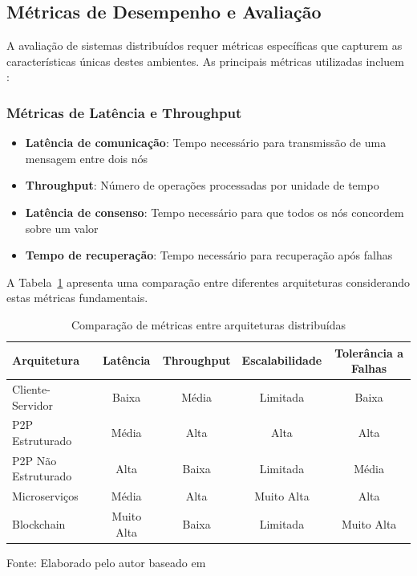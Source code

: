 \subsection{Métricas de Desempenho e Avaliação}

A avaliação de sistemas distribuídos requer métricas específicas que capturem as características únicas destes ambientes. As principais métricas utilizadas incluem \cite{tanenbaum2016sistemas}:

\subsubsection{Métricas de Latência e Throughput}

\begin{itemize}
    \item \textbf{Latência de comunicação}: Tempo necessário para transmissão de uma mensagem entre dois nós
    \item \textbf{Throughput}: Número de operações processadas por unidade de tempo
    \item \textbf{Latência de consenso}: Tempo necessário para que todos os nós concordem sobre um valor
    \item \textbf{Tempo de recuperação}: Tempo necessário para recuperação após falhas
\end{itemize}

A Tabela~\ref{tab:metricas_comparacao} apresenta uma comparação entre diferentes arquiteturas considerando estas métricas fundamentais.

\begin{table}[H]
\centering
\caption{Comparação de métricas entre arquiteturas distribuídas}
\begin{tabular}{|l|c|c|c|c|}
\hline
\textbf{Arquitetura} & \textbf{Latência} & \textbf{Throughput} & \textbf{Escalabilidade} & \textbf{Tolerância a Falhas} \\
\hline
Cliente-Servidor & Baixa & Média & Limitada & Baixa \\
\hline
P2P Estruturado & Média & Alta & Alta & Alta \\
\hline
P2P Não Estruturado & Alta & Baixa & Limitada & Média \\
\hline
Microserviços & Média & Alta & Muito Alta & Alta \\
\hline
Blockchain & Muito Alta & Baixa & Limitada & Muito Alta \\
\hline
\end{tabular}
\label{tab:metricas_comparacao}

{\fontsize{10pt}{\baselineskip}\selectfont
Fonte: Elaborado pelo autor baseado em }
\end{table}

